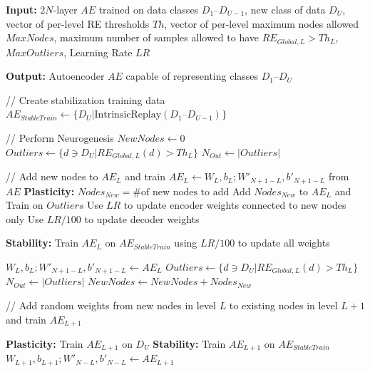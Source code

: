 \documentclass[10pt,conference]{IEEEtran}
\begin{document}
\begin{algorithm} \footnotesize
\caption{Neurogenesis Deep Learning (NDL) \label{algor}}
\begin{algorithmic}
\State \textbf{Input: } $2N$-layer $AE$ trained on data classes $D_1$--$D_{U-1}$, new class of data $D_U$, vector of per-level RE thresholds $Th$, vector of per-level maximum nodes allowed $MaxNodes$, maximum number of samples allowed to have $RE_{Global,L} > Th_L$, $MaxOutliers$, Learning Rate $LR$

\vspace*{.1in}
\State \textbf{Output: } Autoencoder $AE$ capable of representing classes $D_1$--$D_U$

\vspace*{.1in} 
\State // Create stabilization training data
\State $AE_{StableTrain} \leftarrow \{D_U | \text{IntrinsicReplay}(D_1\text{--}D_{U-1}) \}$

\vspace*{.1in} 
\State // Perform Neurogenesis
\State $NewNodes \leftarrow 0$
\State $Outliers \leftarrow \{d \ni D_U | RE_{Global, L}(d) > Th_L\}$
\State $N_{Out} \leftarrow |Outliers|$

\vspace*{.1in} 
\State // Add new nodes to $AE_L$ and train
\State $AE_L \leftarrow W_L, b_L ; W'_{N+1-L}, b'_{N+1-L}$ from $AE$
\State \textbf{Plasticity: } $Nodes_{New} = \text{\# of new nodes to add}$
\State Add $Nodes_{New}$ to $AE_L$ and Train on $Outliers$
\State Use $LR$ to update encoder weights connected to new nodes only
\State Use $LR/100$ to update decoder weights
\State  \parbox[t]{\dimexpr\linewidth-\algorithmicindent-\algorithmicindent}{\textbf{Stability: } Train $AE_L$ on $AE_{StableTrain}$ using $LR/100$ to update all weights}
\State $W_L, b_L; W'_{N+1-L}, b'_{N+1-L} \leftarrow AE_L$
\State $Outliers \leftarrow \{d \ni D_U | RE_{Global, L}(d) > Th_L \}$
\State $N_{Out} \leftarrow |Outliers|$
\State $NewNodes \leftarrow NewNodes + Nodes_{New}$
\EndWhile

\vspace*{.1in} 
\State \parbox[t]{\dimexpr\linewidth-\algorithmicindent}{// Add random weights from new nodes in level $L$ to existing nodes in level $L+1$ and train $AE_{L+1}$}
\State \textbf{Plasticity: } Train $AE_{L+1}$ on $D_U$
\State \textbf{Stability: } Train $AE_{L+1} $ on $AE_{StableTrain}$
\State $W_{L+1}, b_{L+1}; W'_{N-L}, b'_{N-L} \leftarrow AE_{L+1}$
\EndIf
\EndFor 
\end{algorithmic}
\end{algorithm}
\end{document}
